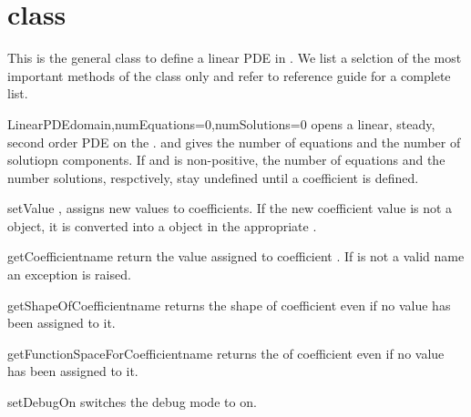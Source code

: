 \section{\LinearPDE class}
This is the general class to define a linear PDE in \escript. We list a selction of the most 
important methods of the class only and refer to reference guide \ReferenceGuide for a complete list.

\begin{classdesc}{LinearPDE}{domain,numEquations=0,numSolutions=0}
opens a linear, steady, second order PDE on the \Domain {}. 
and  gives the number of equations and the number of solutiopn components.
If  and  is non-positive, the number of equations 
and the number solutions, respctively, stay undefined until a coefficient is
defined. 
\end{classdesc}

\begin{methoddesc}[LinearPDE]{setValue}{
,
}
assigns new values to coefficients. 
If the new coefficient value is not a \Data object, it is converted into a \Data object in the
appropriate \FunctionSpace.
\end{methoddesc}

\begin{methoddesc}[LinearPDE]{getCoefficient}{name}
return the value assigned to coefficient . If  is not a valid name 
an exception is raised. 
\end{methoddesc}

\begin{methoddesc}[LinearPDE]{getShapeOfCoefficient}{name}
returns the shape of coefficient  even if no value has been assigned to it.
\end{methoddesc}

\begin{methoddesc}[LinearPDE]{getFunctionSpaceForCoefficient}{name}
returns the \FunctionSpace of coefficient  even if no value has been assigned to it.
\end{methoddesc}

\begin{methoddesc}[LinearPDE]{setDebugOn}{}
switches the debug mode to on.
\end{methoddesc}

